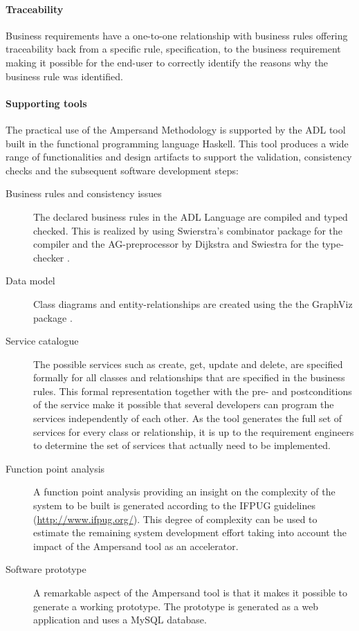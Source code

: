 \paragraph{Traceability}
Business requirements have a one-to-one relationship with business rules offering traceability back from a specific rule, specification, to the business requirement making it possible for the end-user to correctly identify the reasons why the business rule was identified.

\paragraph{Supporting tools}
The practical use of the Ampersand Methodology is supported by the ADL tool built in the functional programming language Haskell. 
This tool produces a wide range of functionalities and design artifacts to support the validation, consistency checks and the subsequent software development steps:
\begin{description}
	\item[Business rules and consistency issues] The declared business rules in the ADL Language are compiled and typed checked.
	This is realized by using Swierstra's combinator package for the compiler   and the AG-preprocessor by Dijkstra and Swiestra for the type-checker .
	\item[Data model]  Class diagrams and entity-relationships are created using the the GraphViz package . 
	\item[Service catalogue] The possible services such as create, get, update and delete,  are specified formally for all classes and relationships that are specified in the business rules.
	This formal representation together with the pre- and postconditions of the service make it possible that several developers can program the services independently of each other. 
	As the tool generates the full set of services for every class or relationship, it is up to the requirement engineers to determine the set of services that actually need to be implemented.
	\item[Function point analysis] A function point analysis providing an insight on the complexity of the system to be built  is generated according to the IFPUG guidelines (\url{http://www.ifpug.org/}). This degree of complexity can be used to estimate the remaining system development effort taking into account the impact of the Ampersand tool as an accelerator.
	\item[Software prototype] A remarkable aspect of the Ampersand tool is that it makes it possible to generate a working prototype.
	The prototype is generated as a web application and uses a MySQL database.
\end{description}
 
